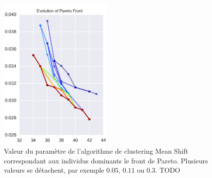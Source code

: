 \documentclass{llncs}
\begin{document}


\begin{figure}[ht]
  \begin{center}
    \includegraphics[width=0.5\textwidth]{figures/Pareto_front_evolution.pdf}
    \caption{Valeur du paramètre de l'algorithme de clustering Mean Shift correspondant aux individus dominants le front de Pareto. Plusieurs valeurs se détachent, par exemple $0.05$, $0.11$ ou $0.3$. TODO}
    \label{fig:pareto_front}
  \end{center}
\end{figure}
\end{document}
